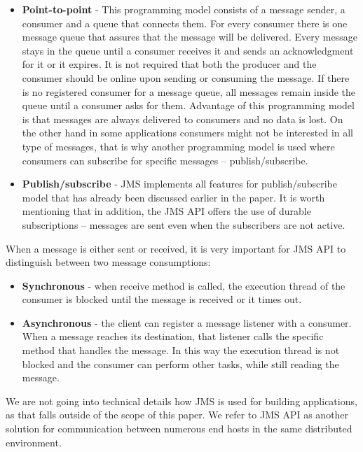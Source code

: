 \documentclass{sigplanconf}
\begin{document}
\begin{itemize} \itemsep1pt \parskip0pt 
\item \textbf{Point-to-point} - This programming model consists of a message sender, a consumer and a queue that connects them. For every consumer there is one message queue that assures that the message will be delivered. Every message stays in the queue until a consumer receives it and sends an acknowledgment for it or it expires. It is not required that both the producer and the consumer should be online upon sending or consuming the message. If there is no registered consumer for a message queue, all messages remain inside the queue until a consumer asks for them. Advantage of this programming model is that messages are always delivered to consumers and no data is lost. On the other hand in some applications consumers might not be interested in all type of messages, that is why another programming model is used where consumers can subscribe for specific messages – publish/subscribe.
\item \textbf{Publish/subscribe} - JMS implements all features for publish/subscribe model that has already been discussed earlier in the paper. It is worth mentioning that in addition, the JMS API offers the use of durable subscriptions – messages are sent even when the subscribers are not active.

\end{itemize}

When a message is either sent or received, it is very important for JMS API to distinguish between two message consumptions:
\begin{itemize} \itemsep1pt \parskip0pt 
\item \textbf{Synchronous} - when receive method is called, the execution thread of the consumer is blocked until the message is received or it times out.
\item \textbf{Asynchronous} - the client can register a message listener with a consumer. When a message reaches its destination, that listener calls the specific method that handles the message. In this way the execution thread is not blocked and the consumer can perform other tasks, while still reading the message.

\end{itemize}

We are not going into technical details how JMS is used for building applications, as that falls outside of the scope of this paper. We refer to JMS API as another solution for communication between numerous end hosts in the same distributed environment.
\end{document}
